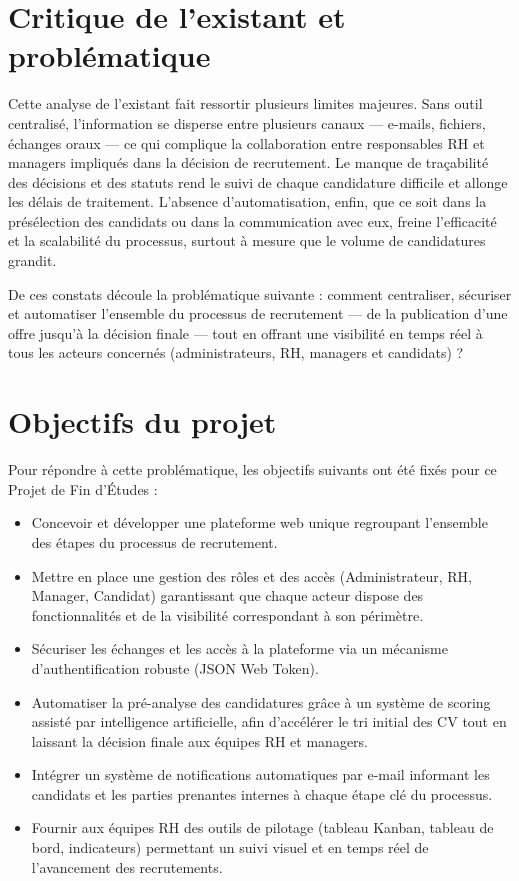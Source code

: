\section{Critique de l’existant et problématique}
\label{sec_1_4}
Cette analyse de l’existant fait ressortir plusieurs limites majeures. Sans outil centralisé, l’information se disperse entre plusieurs canaux — e-mails, fichiers, échanges oraux — ce qui complique la collaboration entre responsables RH et managers impliqués dans la décision de recrutement. Le manque de traçabilité des décisions et des statuts rend le suivi de chaque candidature difficile et allonge les délais de traitement. L’absence d’automatisation, enfin, que ce soit dans la présélection des candidats ou dans la communication avec eux, freine l’efficacité et la scalabilité du processus, surtout à mesure que le volume de candidatures grandit.

De ces constats découle la problématique suivante : comment centraliser, sécuriser et automatiser l’ensemble du processus de recrutement — de la publication d’une offre jusqu’à la décision finale — tout en offrant une visibilité en temps réel à tous les acteurs concernés (administrateurs, RH, managers et candidats) ?

\section{Objectifs du projet}
\label{sec_1_5}
Pour répondre à cette problématique, les objectifs suivants ont été fixés pour ce Projet de Fin d’Études :

\begin{itemize}
\item Concevoir et développer une plateforme web unique regroupant l’ensemble des étapes du processus de recrutement.
\item Mettre en place une gestion des rôles et des accès (Administrateur, RH, Manager, Candidat) garantissant que chaque acteur dispose des fonctionnalités et de la visibilité correspondant à son périmètre.
\item Sécuriser les échanges et les accès à la plateforme via un mécanisme d’authentification robuste (JSON Web Token).
\item Automatiser la pré-analyse des candidatures grâce à un système de scoring assisté par intelligence artificielle, afin d’accélérer le tri initial des CV tout en laissant la décision finale aux équipes RH et managers.
\item Intégrer un système de notifications automatiques par e-mail informant les candidats et les parties prenantes internes à chaque étape clé du processus.
\item Fournir aux équipes RH des outils de pilotage (tableau Kanban, tableau de bord, indicateurs) permettant un suivi visuel et en temps réel de l’avancement des recrutements.
\end{itemize}

